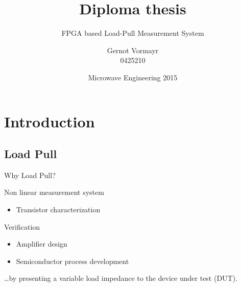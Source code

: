 \documentclass{beamer}
\title[FPGA based LP]{Diploma thesis}
\author[G.~Vormayr]{Gernot Vormayr\\0425210}
\institute[EMCE]{Institute of Electrodynamics, Microwave and Circuit Engineering}
\date[MW '15]{Microwave Engineering 2015}
\subtitle{FPGA based Load-Pull Measurement System}
\begin{document}
\begin{frame}
    \titlepage
\end{frame}


\section{Introduction}
\subsection{Load Pull}

\begin{frame}{Why Load Pull?}
    \begin{block}{Non linear measurement system}
        \begin{itemize}
            \item Transistor characterization
        \end{itemize}
    \end{block}
    \begin{block}{Verification}
        \begin{itemize}
            \item Amplifier design
            \item Semiconductor process development
        \end{itemize}
    \end{block}
    \qquad\dots by presenting a variable load impedance to the device under test (DUT).
\end{frame}
\end{document}
